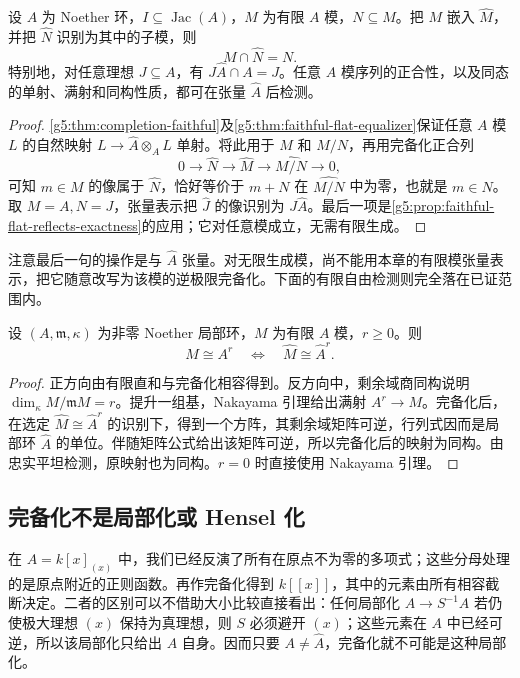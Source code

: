\begin{proposition}\label{g5:prop:completion-submodule-contraction}
	设 \(A\) 为 Noether 环，\(I\subseteq\operatorname{Jac}(A)\)，\(M\) 为有限 \(A\) 模，\(N\subseteq M\)。把 \(M\) 嵌入 \(\widehat M\)，并把 \(\widehat N\) 识别为其中的子模，则
	\[
		M\cap\widehat N=N.
	\]
	特别地，对任意理想 \(J\subseteq A\)，有 \(J\widehat A\cap A=J\)。任意 \(A\) 模序列的正合性，以及同态的单射、满射和同构性质，都可在张量 \(\widehat A\) 后检测。
\end{proposition}
\begin{proof}
	\cref{g5:thm:completion-faithful}及\cref{g5:thm:faithful-flat-equalizer}保证任意 \(A\) 模 \(L\) 的自然映射
	\(L\to\widehat A\otimes_A L\) 单射。将此用于 \(M\) 和 \(M/N\)，再用完备化正合列
	\[
		0\longrightarrow\widehat N\longrightarrow\widehat M
		\longrightarrow\widehat{M/N}\longrightarrow0,
	\]
	可知 \(m\in M\) 的像属于 \(\widehat N\)，恰好等价于 \(m+N\) 在 \(\widehat{M/N}\) 中为零，也就是 \(m\in N\)。取 \(M=A,N=J\)，张量表示把 \(\widehat J\) 的像识别为 \(J\widehat A\)。最后一项是\cref{g5:prop:faithful-flat-reflects-exactness}的应用；它对任意模成立，无需有限生成。
\end{proof}

注意最后一句的操作是与 \(\widehat A\) 张量。对无限生成模，尚不能用本章的有限模张量表示，把它随意改写为该模的逆极限完备化。下面的有限自由检测则完全落在已证范围内。

\begin{corollary}\label{g5:cor:completion-free-detection}
	设 \((A,\mathfrak m,\kappa)\) 为非零 Noether 局部环，\(M\) 为有限 \(A\) 模，\(r\geq0\)。则
	\[
		M\cong A^r\quad\Longleftrightarrow\quad
		\widehat M\cong\widehat A^r.
	\]
\end{corollary}
\begin{proof}
	正方向由有限直和与完备化相容得到。反方向中，剩余域商同构说明
	\(\dim_\kappa M/\mathfrak mM=r\)。提升一组基，Nakayama 引理给出满射 \(A^r\to M\)。完备化后，在选定 \(\widehat M\cong\widehat A^r\) 的识别下，得到一个方阵，其剩余域矩阵可逆，行列式因而是局部环 \(\widehat A\) 的单位。伴随矩阵公式给出该矩阵可逆，所以完备化后的映射为同构。由忠实平坦检测，原映射也为同构。\(r=0\) 时直接使用 Nakayama 引理。
\end{proof}

\subsection{完备化不是局部化或 Hensel 化}
\label{g5:subsec:0704:05}

在 \(A=k[x]_{(x)}\) 中，我们已经反演了所有在原点不为零的多项式；这些分母处理的是原点附近的正则函数。再作完备化得到 \(k[[x]]\)，其中的元素由所有相容截断决定。二者的区别可以不借助大小比较直接看出：任何局部化 \(A\to S^{-1}A\) 若仍使极大理想 \((x)\) 保持为真理想，则 \(S\) 必须避开 \((x)\)；这些元素在 \(A\) 中已经可逆，所以该局部化只给出 \(A\) 自身。因而只要 \(A\ne\widehat A\)，完备化就不可能是这种局部化。

